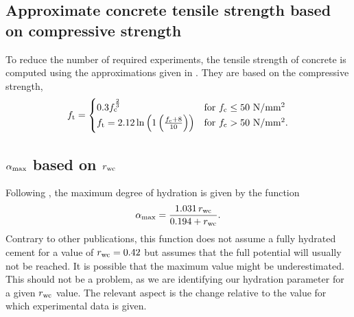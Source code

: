\subsection{Approximate concrete tensile strength based on compressive strength}
To reduce the number of required experiments, the tensile strength of concrete is computed using the approximations given in \citeauthor{DIN1992-1-1}.
They are based on the compressive strength, 
\begin{align}
f_{\text{t}} = 
\begin{cases}
0.3 f_{\text{c}}^{\frac{2}{3}}  & \text{for $f_{\text{c}} \le 50$ N/mm$^2$}\\
f_{\text{t}} =2.12 \ln \left( 1 \left( \frac{f_{\text{c}} + 8}{10}\right) \right)& \text{for $f_{\text{c}} > 50$ N/mm$^2$}  \label{eq:tensilstrength}.
\end{cases}
\end{align}
\subsection{\texorpdfstring{$\alpha_{\text{max}}$}{Maxiumum DoH} based on \texorpdfstring{$r_{\text{wc}}$}{w/c}}
Following \cite{Mills1966fico}, the maximum degree of hydration is given by the function
\begin{align}
	\alpha_{\text{max}} = \dfrac{1.031\,r_{\text{wc}}}{0.194 + r_{\text{wc}}}.
\end{align}
Contrary to other publications, this function does not assume a fully hydrated cement for a value of $r_{\text{wc}} = 0.42$ but assumes that the full potential will usually not be reached.
It is possible that the maximum value might be underestimated.
This should not be a problem, as we are identifying our hydration parameter for a given $r_{\text{wc}}$ value.
The relevant aspect is the change relative to the value for which experimental data is given.